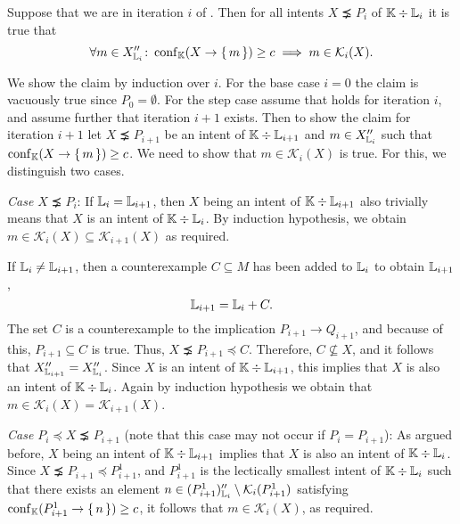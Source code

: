 \begin{Proposition}
  \label{prop:exploration-by-confidence-crucial-condition-holds}
  Suppose that we are in iteration $i$ of
  .  Then for all intents $X
  \precneq P_{i}$ of ${\mathbb{K}} \div {\ensuremath{\mathbb{L}}}_{i}$ it is true that
  \begin{equation}
    \label{eq:42}
    \forall m \in X_{{\mathbb{L}}_{i}}'' \colon \operatorname{conf}_{{\mathbb{K}}}(X \to {\ensuremath{\{\,m\,\}}}) \ge c \implies m
    \in \mathcal{K}_{i}(X).
\end{equation}
\end{Proposition}
\begin{Proof}
  We show the claim by induction over $i$.  For the base case $i = 0$ the claim is vacuously
  true since $P_{0} = \emptyset$.  For the step case assume that  holds for
  iteration $i$, and assume further that iteration $i+1$ exists.  Then to show the claim
  for iteration $i+1$ let $X \precneq P_{i+1}$ be an intent of ${\mathbb{K}} \div {\ensuremath{\mathbb{L}}}_{i+1}$
  and $m \in X_{{\mathbb{L}}_{i}}''$ such that $\operatorname{conf}_{{\mathbb{K}}}(X \to {\ensuremath{\{\,m\,\}}}) \ge c$. We need to
  show that $m \in \mathcal{K}_{i}(X)$ is true.  For this, we distinguish two cases.

  \textit{Case $X \precneq P_{i}$}: If ${\mathbb{L}}_{i} = {\mathbb{L}}_{i+1}$, then $X$ being an
  intent of ${\mathbb{K}} \div {\ensuremath{\mathbb{L}}}_{i+1}$ also trivially means that $X$ is an intent of ${\mathbb{K}} \div {\ensuremath{\mathbb{L}}}_{i}$.  By induction hypothesis, we obtain $m \in \mathcal{K}_{i}(X)
  \subseteq \mathcal{K}_{i+1}(X)$ as required.

  If ${\mathbb{L}}_{i} \neq {\ensuremath{\mathbb{L}}}_{i+1}$, then a counterexample $C \subseteq M$ has been added
  to ${\mathbb{L}}_{i}$ to obtain ${\mathbb{L}}_{i+1}$, \ie
  \begin{equation*}
    {\ensuremath{\mathbb{L}}}_{i+1} = {\mathbb{L}}_{i} + C.
  \end{equation*}
  The set $C$ is a counterexample to the implication $P_{i+1} \to Q_{i+1}$, and because of
  this, $P_{i+1} \subseteq C$ is true.  Thus, $X \precneq P_{i+1} \preceq C$.  Therefore,
  $C \not\subseteq X$, and it follows that $X_{{\mathbb{L}}_{i+1}}'' = X_{{\mathbb{L}}_{i}}''$.  Since
  $X$ is an intent of ${\mathbb{K}} \div {\ensuremath{\mathbb{L}}}_{i+1}$, this implies that $X$ is also an intent
  of ${\mathbb{K}} \div {\ensuremath{\mathbb{L}}}_{i}$.  Again by induction hypothesis we obtain that $m \in
  \mathcal{K}_{i}(X) = \mathcal{K}_{i+1}(X)$.

  \textit{Case $P_{i} \preceq X \precneq P_{i+1}$} (note that this case may not occur if
  $P_{i} = P_{i+1}$): As argued before, $X$ being an intent of ${\mathbb{K}} \div {\ensuremath{\mathbb{L}}}_{i+1}$
  implies that $X$ is also an intent of ${\mathbb{K}} \div {\ensuremath{\mathbb{L}}}_{i}$.  Since $X \precneq
  P_{i+1} \preceq P_{i+1}^{1}$, and $P_{i+1}^{1}$ is the lectically smallest intent of
  ${\mathbb{K}} \div {\ensuremath{\mathbb{L}}}_{i}$ such that there exists an element $n \in (P_{i+1}^{1})_{{\mathbb{L}}_{i}}'' \setminus \mathcal{K}_{i}(P_{i+1}^{1})$ satisfying $\operatorname{conf}_{{\mathbb{K}}}(P_{i+1}^{1} \to {\ensuremath{\{\,n\,\}}}) \ge c$, it follows that $m \in \mathcal{K}_{i}(X)$, as
  required.
\end{Proof}

